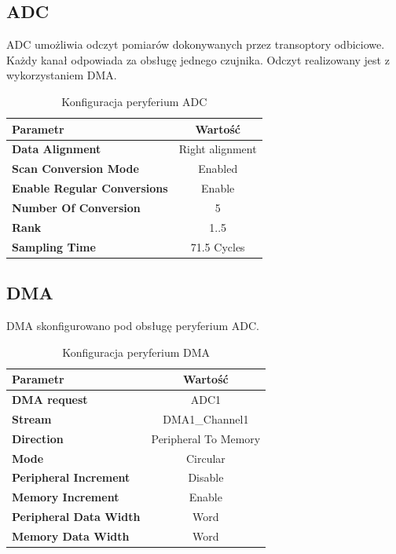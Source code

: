 \documentclass[10pt, a4paper]{article}
\begin{document}
\subsection{ADC}
\noindent ADC umożliwia odczyt pomiarów dokonywanych przez transoptory odbiciowe. Każdy kanał odpowiada za obsługę jednego czujnika. Odczyt realizowany jest z wykorzystaniem DMA.
\begin{table}[H]
	\centering
	\begin{tabular}{|l|c|} \hline
		\textbf{Parametr} & Wartość \\
		\hline
		\hline  \textbf{Data Alignment}& Right alignment\\\hline
		\textbf{Scan Conversion Mode} & Enabled\\
		\hline
		\textbf{Enable Regular Conversions} & Enable\\
		\hline
		\textbf{Number Of Conversion} & 5\\
		\hline
		\textbf{Rank} & 1..5\\
		\hline
		\textbf{Sampling Time} & 71.5 Cycles\\
		\hline
	\end{tabular}
	\caption{Konfiguracja peryferium ADC}
	\label{tab:ADC}
\end{table}

\subsection{DMA}
\noindent DMA skonfigurowano pod obsługę peryferium ADC. 
\begin{table}[H]
	\centering
	\begin{tabular}{|l|c|} \hline
		\textbf{Parametr} & Wartość \\
		\hline
		\hline  \textbf{DMA request}& ADC1\\\hline
		\textbf{Stream} & DMA1\_Channel1\\
		\hline
		\textbf{Direction} & Peripheral To Memory\\
		\hline
		\textbf{Mode} & Circular\\
		\hline
		\textbf{Peripheral Increment} & Disable\\
		\hline
		\textbf{Memory Increment} & Enable\\
		\hline
		\textbf{Peripheral Data Width} & Word\\
		\hline
		\textbf{Memory Data Width} & Word\\
		\hline
	\end{tabular}
	\caption{Konfiguracja peryferium DMA}
	\label{tab:DAC}
\end{table}
\end{document}
